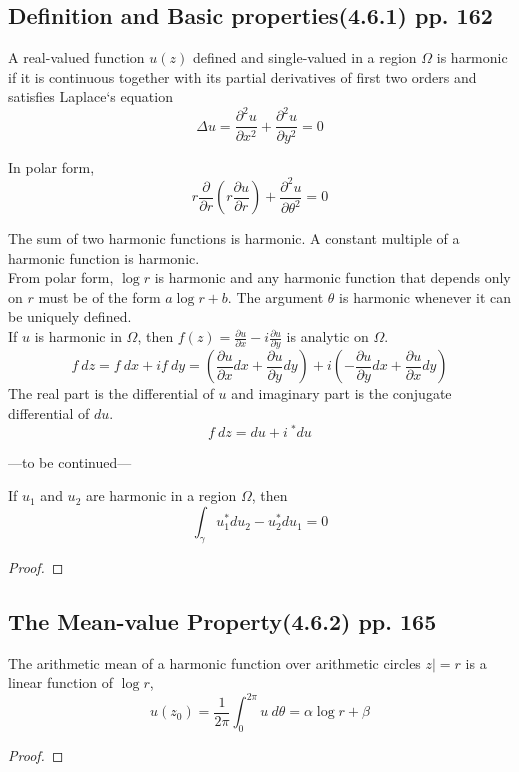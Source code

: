 \subsection{Definition and Basic properties(4.6.1) pp. 162}
\begin{definition}[harmonic]
	A real-valued function $u(z)$ defined and single-valued in a region $\Omega$ is harmonic if it is continuous together with its partial derivatives of first two orders and satisfies Laplace`s equation
	\[ \Delta u = \frac{\partial^2 u}{\partial x^2} + \frac{\partial^2 u}{\partial y^2} = 0 \]

	In polar form,
	\[ r \frac{\partial}{\partial r} \left( r \frac{\partial u}{\partial r}\right) + \frac{\partial^2 u}{\partial \theta^2} = 0 \]
\end{definition}
\begin{remark}
	The sum of two harmonic functions is harmonic. A constant multiple of a harmonic function is harmonic.\\

	From polar form, $\log r$ is harmonic and any harmonic function that depends only on $r$ must be of the form $a \log r + b$.  The argument $\theta$ is harmonic whenever it can be uniquely defined. \\

	If $u$ is harmonic in $\Omega$, then $f(z) = \frac{\partial u}{\partial x} - i \frac{\partial u}{\partial y}$ is analytic on $\Omega$.\\

	\[ f\ dz = f\ dx+i f\ dy = \left( \frac{\partial u}{\partial x} dx + \frac{\partial u}{\partial y}dy \right) + i \left( -\frac{\partial u}{\partial y}dx + \frac{\partial u}{\partial x}dy \right) \]
	The real part is the differential of $u$ and imaginary part is the conjugate differential of $du$.
	\[ f\ dz = du + i\ \underset{}{^\ast}du \]
\end{remark}

---to be continued---

\begin{theorem}
	If $u_1$ and $u_2$ are harmonic in a region $\Omega$, then
	\[ \int_\gamma u_1 ^\ast du_2 - u_2 ^\ast du_1 = 0 \]
\end{theorem}
\begin{proof}
\end{proof}

\subsection{The Mean-value Property(4.6.2) pp. 165}
\begin{theorem}
	The arithmetic mean of a harmonic function over arithmetic circles $z|=r$ is a linear function of $\log r$,	
	\begin{equation}
		u(z_0) = \frac{1}{2\pi} \int_0^{2\pi} u\ d\theta = \alpha \log r + \beta
	\end{equation}
\end{theorem}
\begin{proof}
\end{proof}

